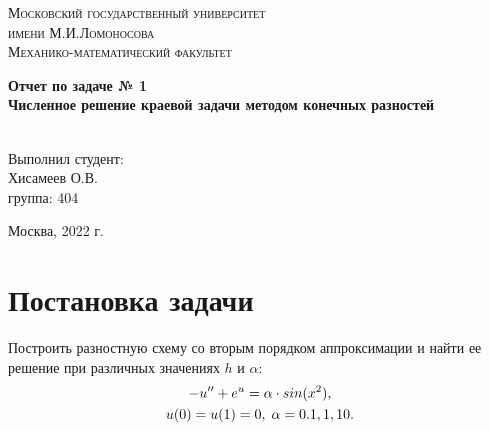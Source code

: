 \documentclass[a4paper,11.9pt]{article}
\begin{document}
\renewcommand{\chaptername}{Лабораторная работа}
\def\contentsname{Содержание}

\begin{titlepage}\large
\begin{center}
\textsc{Московский государственный университет\\
имени М.И.Ломоносова\\[5mm]
Механико-математический факультет\\[5cm]
}


\Large\textbf{Отчет по задаче № 1\\[4mm]
Численное решение краевой задачи методом конечных разностей\\[7mm]
\\[19mm]
}
\end{center}

\vfill
\begin{flushright}
\begin{minipage}{0.25\textwidth}
\begin{flushleft}
Выполнил студент:\\[2mm] 
Хисамеев О.В.\\
группа: 404\\[5mm]
\end{flushleft}
\end{minipage}
	
\end{flushright}%
\vfill
\begin{center}
 Москва, 2022 г.
\end{center}
\end{titlepage}
\newpage

\section*{\centering Постановка задачи} \Large
Построить разностную схему со вторым порядком аппроксимации и найти ее решение при различных значениях $h$ и $\alpha$:
\begin{gather}
-u^{\prime\prime} + e^u = \alpha \cdot sin(x^2),\label{1}\\
u(0) = u(1) = 0, \; \alpha = 0.1, 1, 10.\notag
\end{gather}
\end{document}
